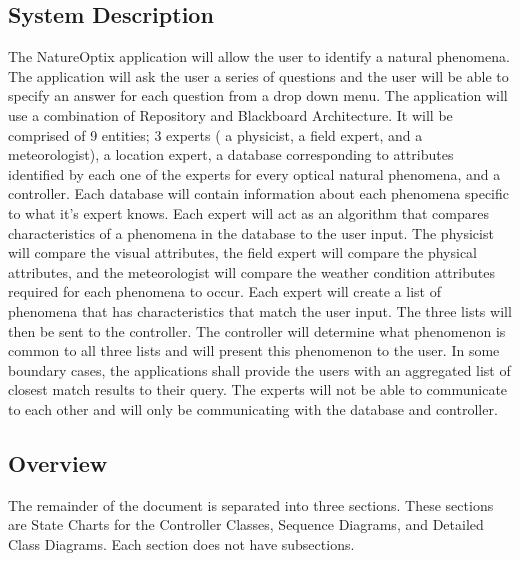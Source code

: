 \documentclass[]{article}
\begin{document}
\subsection{System Description}
\label{sub:system_description} 
The NatureOptix application will allow the user to identify a natural phenomena. The application will ask the user a series of questions and the user will be able to specify an answer for each question from a drop down menu. The application will use a combination of Repository and Blackboard Architecture. It will be comprised of 9 entities; 3 experts ( a physicist, a field expert, and a meteorologist), a location expert, a database corresponding to attributes identified by each one of the experts for every optical natural phenomena, and a controller. Each database will contain information about each phenomena specific to what it's expert knows. Each expert will act as an algorithm that compares characteristics of a phenomena in the database to the user input. The physicist will compare the visual attributes, the field expert will compare the physical attributes, and the meteorologist will compare the weather condition attributes required for each phenomena to occur. Each expert will create a list of phenomena that has characteristics that match the user input. The three lists will then be sent to the controller. The controller will determine what phenomenon is common to all three lists and will present this phenomenon to the user. In some boundary cases, the applications shall provide the users with an aggregated list of closest match results to their query. The experts will not be able to communicate to each other and will only be communicating with the database and controller. 

\subsection{Overview}
\label{sub:overview}
The remainder of the document is separated into three sections. These sections are State Charts for the Controller Classes, Sequence Diagrams, and Detailed Class Diagrams. Each section does not have subsections.
\end{document}

